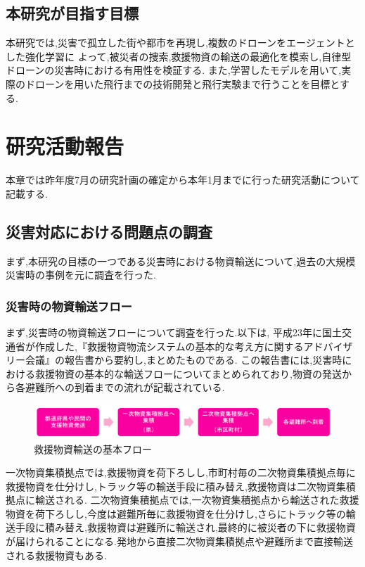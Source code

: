 \documentclass{article}[jsarticle]
\begin{document}
\subsection{本研究が目指す目標}
本研究では,災害で孤立した街や都市を再現し,複数のドローンをエージェントとした強化学習に
よって,被災者の捜索,救援物資の輸送の最適化を模索し,自律型ドローンの災害時における有用性を検証する. 
また,学習したモデルを用いて,実際のドローンを用いた飛行までの技術開発と飛行実験まで行うことを目標とする.


\section{研究活動報告}
本章では昨年度7月の研究計画の確定から本年1月までに行った研究活動について記載する.
\subsection{災害対応における問題点の調査}
まず,本研究の目標の一つである災害時における物資輸送について,過去の大規模災害時の事例を元に調査を行った.
\subsubsection{災害時の物資輸送フロー}
まず,災害時の物資輸送フローについて調査を行った.以下は, 平成23年に国土交通省が作成した,『救援物資物流システムの基本的な考え方に関するアドバイザリー会議』\cite{doc02}の報告書から要約し,まとめたものである.
この報告書には,災害時における救援物資の基本的な輸送フローについてまとめられており,物資の発送から各避難所への到着までの流れが記載されている.
\begin{figure}[H]
    \centering
    \includegraphics[width=\textwidth]{./Images/20240127180600.png}
    \caption{救援物資輸送の基本フロー}
\end{figure}
一次物資集積拠点では,救援物資を荷下ろしし,市町村毎の二次物資集積拠点毎に救援物資を仕分けし,トラック等の輸送手段に積み替え,救援物資は二次物資集積拠点に輸送される.
二次物資集積拠点では,一次物資集積拠点から輸送された救援物資を荷下ろしし,今度は避難所毎に救援物資を仕分けし,さらにトラック等の輸送手段に積み替え,救援物資は避難所に輸送され,最終的に被災者の下に救援物資が届けられることになる.発地から直接二次物資集積拠点や避難所まで直接輸送される救援物資もある.\par 
\end{document}
